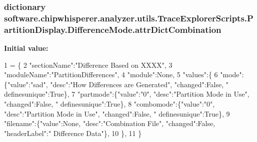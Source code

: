 \subsubsection[{attr\+Dict\+Combination}]{\setlength{\rightskip}{0pt plus 5cm}dictionary software.\+chipwhisperer.\+analyzer.\+utils.\+Trace\+Explorer\+Scripts.\+Partition\+Display.\+Difference\+Mode.\+attr\+Dict\+Combination\hspace{0.3cm}{\ttfamily [static]}}\label{classsoftware_1_1chipwhisperer_1_1analyzer_1_1utils_1_1TraceExplorerScripts_1_1PartitionDisplay_1_1DifferenceMode_a3316d0eb98412ff5aae5d04390025c9f}
{\bfseries Initial value\+:}
\begin{DoxyCode}
1 = \{
2                 \textcolor{stringliteral}{"sectionName"}:\textcolor{stringliteral}{"Difference Based on XXXX"},
3                 \textcolor{stringliteral}{"moduleName"}:\textcolor{stringliteral}{"PartitionDifferences"},
4                 \textcolor{stringliteral}{"module"}:\textcolor{keywordtype}{None},
5                 \textcolor{stringliteral}{"values"}:\{
6                     \textcolor{stringliteral}{"mode"}:\{\textcolor{stringliteral}{"value"}:\textcolor{stringliteral}{"sad"}, \textcolor{stringliteral}{"desc"}:\textcolor{stringliteral}{"How Differences are Generated"}, \textcolor{stringliteral}{"changed"}:\textcolor{keyword}{False}, \textcolor{stringliteral}{"
      definesunique"}:\textcolor{keyword}{True}\},
7                     \textcolor{stringliteral}{"partmode"}:\{\textcolor{stringliteral}{"value"}:\textcolor{stringliteral}{"0"}, \textcolor{stringliteral}{"desc"}:\textcolor{stringliteral}{"Partition Mode in Use"}, \textcolor{stringliteral}{"changed"}:\textcolor{keyword}{False}, \textcolor{stringliteral}{"
      definesunique"}:\textcolor{keyword}{True}\},
8                     \textcolor{stringliteral}{"combomode"}:\{\textcolor{stringliteral}{"value"}:\textcolor{stringliteral}{"0"}, \textcolor{stringliteral}{"desc"}:\textcolor{stringliteral}{"Partition Mode in Use"}, \textcolor{stringliteral}{"changed"}:\textcolor{keyword}{False}, \textcolor{stringliteral}{"
      definesunique"}:\textcolor{keyword}{True}\},
9                     \textcolor{stringliteral}{"filename"}:\{\textcolor{stringliteral}{"value"}:\textcolor{keywordtype}{None}, \textcolor{stringliteral}{"desc"}:\textcolor{stringliteral}{"Combination File"}, \textcolor{stringliteral}{"changed"}:\textcolor{keyword}{False}, \textcolor{stringliteral}{"headerLabel"}:\textcolor{stringliteral}{"
      Difference Data"}\},
10                     \},
11                 \}
\end{DoxyCode}


